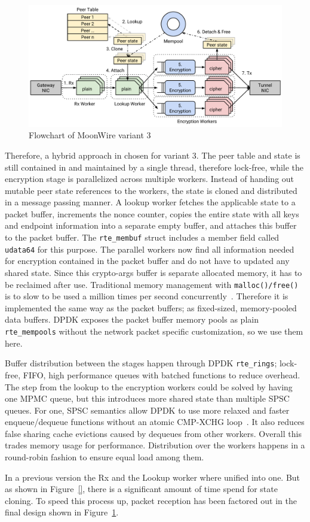 \begin{figure}[h]
	\centering
	\includegraphics[width=1\linewidth]{figures/moonwire-variant-3}
	\caption{Flowchart of MoonWire variant 3}
	\label{fig:moonwire-variant-3}
\end{figure}

Therefore, a hybrid approach in chosen for variant 3. The peer table and state is still contained in and maintained by a single thread, therefore lock-free, while the encryption stage is parallelized across multiple workers. Instead of handing out mutable peer state references to the workers, the state is cloned and distributed in a message passing manner.
A lookup worker fetches the applicable state to a packet buffer, increments the nonce counter, copies the entire state with all keys and endpoint information into a separate empty buffer, and attaches this buffer to the packet buffer. The \texttt{rte\_membuf} struct includes a member field called \texttt{udata64} for this purpose. The parallel workers now find all information needed for encryption contained in the packet buffer and do not have to updated any shared state.
Since this crypto-args buffer is separate allocated memory, it has to be reclaimed after use. Traditional memory management with \texttt{malloc()/free()} is to slow to be used a million times per second concurrently~\cite{TODO}. Therefore it is implemented the same way as the packet buffers; as fixed-sized, memory-pooled data buffers. 
DPDK exposes the packet buffer memory pools as plain \texttt{rte\_mempools} without the network packet specific customization, so we use them here.

Buffer distribution between the stages happen through DPDK \texttt{rte\_rings}; lock-free, FIFO, high performance queues with batched functions to reduce overhead. 
The step from the lookup to the encryption workers could be solved by having one MPMC queue, but this introduces more shared state than multiple SPSC queues. For one, SPSC semantics allow DPDK to use more relaxed and faster enqueue/dequeue functions without an atomic CMP-XCHG loop~\cite{dpdk-rte-ring-enqueue}. It also reduces false sharing cache evictions caused by dequeues from other workers. Overall this trades memory usage for performance. Distribution over the workers happens in a round-robin fashion to ensure equal load among them.


In a previous version the Rx and the Lookup worker where unified into one. But as shown in Figure~\ref{}, there is a significant amount of time spend for state cloning. To speed this process up, packet reception has been factored out in the final design shown in Figure~\ref{fig:moonwire-variant-3}.

